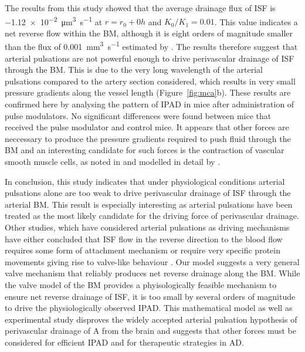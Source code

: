 \documentclass{frontiersFPHY} %
\newcommand{\Ab}{A\textbeta\xspace}
\begin{document}
The results from this study showed that the average drainage flux of ISF is \SI{-1.12e-2}{\cubic\micro\metre\per\second} at $r = r_0 + 0h$ and $K_0/K_1 = 0.01$. This value indicates a net reverse flow within the BM, although it is eight orders of magnitude smaller than the flux of \SI{0.001}{\cubic\milli\metre\per\second} estimated by \cite{Arbel-Ornath2013}. The results therefore suggest that arterial pulsations are not powerful enough to drive perivascular drainage of ISF through the BM. This is due to the very long wavelength of the arterial pulsations compared to the artery section considered, which results in very small pressure gradients along the vessel length (Figure~\ref{fig:mca}b). These results are confirmed here by analysing the pattern of IPAD in mice after administration of pulse modulators. No significant differences were found between mice that received the pulse modulator and control mice. It appears that other forces are neccessary to produce the pressure gradients required to push fluid through the BM and an interesting candidate for such forces is the contraction of vascular smooth muscle cells, as noted in \cite{DiMarco2015} and modelled in detail by \cite{Aldea2016}.

In conclusion, this study indicates that under physiological conditions arterial pulsations alone are too weak to drive perivascular drainage of ISF through the arterial BM. This result is especially interesting as arterial pulsations have been treated as the most likely candidate for the driving force of perivascular drainage. Other studies, which have considered arterial pulsations as driving mechanisms have either concluded that ISF flow in the reverse direction to the blood flow requires some form of attachment mechanism \cite{Schley2006,Wang2011} or require very specific protein movements giving rise to valve-like behaviour \cite{Sharp2015}. Our model suggests a very general valve mechanism that reliably produces net reverse drainage along the BM. While the valve model of the BM provides a phyisologically feasible mechanism to ensure net reverse drainage of ISF, it is too small by several orders of magnitude to drive the physiologically observed IPAD. This mathematical model as well as experimental study disproves the widely accepted arterial pulsation hypothesis of perivascular drainage of \Ab from the brain \cite{Weller2009,Carare2008,Hawkes2011,Morris2014,Schley2006,Attems2011,Wang2011,Iliff2012,Asgari2015,Sharp2015,Weller2015a} and suggests that other forces must be considered for efficient IPAD and for therapeutic strategies in AD.
\end{document}
